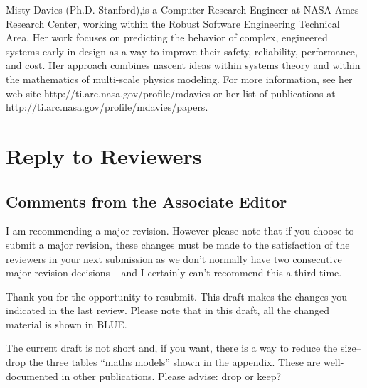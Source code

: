 \documentclass[10pt,journal,compsoc]{IEEEtran}
\newenvironment{changed}{\par}{\par}
\begin{document}
\begin{IEEEbiography}{Misty Davies}
(Ph.D. Stanford),is a Computer Research Engineer at
  NASA Ames Research Center, working within the
  Robust Software Engineering Technical Area.  Her
  work focuses on predicting the behavior of
  complex, engineered systems early in design as a
  way to improve their safety, reliability,
  performance, and cost. Her approach combines
  nascent ideas within systems theory and within the
  mathematics of multi-scale physics modeling.
For more information, see her web site http://ti.arc.nasa.gov/profile/mdavies
or her  list of publications at
http://ti.arc.nasa.gov/profile/mdavies/papers.
\end{IEEEbiography}



\clearpage
 \setcounter{page}{1}
\section*{Reply to Reviewers}
\subsection*{Comments from the Associate Editor}

 I am recommending a major revision.  However please note that if you choose to submit a major revision, these changes must be made to the satisfaction of the reviewers in your next submission as we don't normally have two consecutive major revision decisions -- and I certainly can't recommend this a third time.
\begin{changed}
Thank you for the opportunity to resubmit. 
This draft makes the changes you indicated in the last review.
Please note that in this draft, all the changed material is shown in BLUE.

The current draft is not short and, if you want,
there is a way to reduce the size-- drop the three
tables ``maths models'' shown in the appendix. These
are well-documented in other publications.  Please
advise: drop or keep?
\end{changed}
\end{document}
